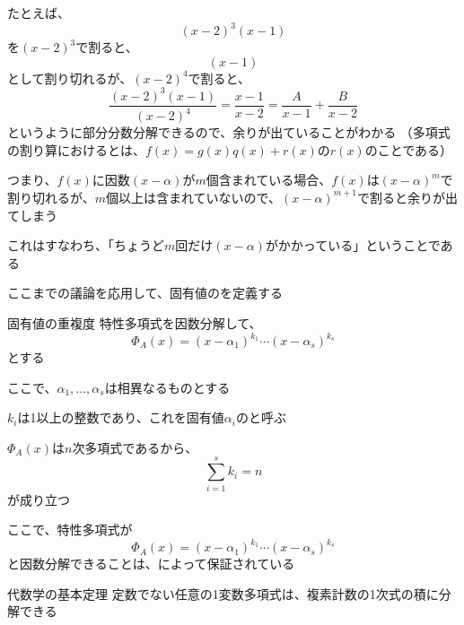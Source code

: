 \documentclass[../../../topic_linear-algebra]{subfiles}
\begin{document}
\br

たとえば、
\begin{equation*}
  (x-2)^3 (x-1)
\end{equation*}
を$(x-2)^3$で割ると、
\begin{equation*}
  (x - 1)
\end{equation*}
として割り切れるが、$(x-2)^4$で割ると、
\begin{equation*}
  \frac{(x-2)^3 (x-1)}{(x-2)^4} = \frac{x-1}{x-2} = \frac{A}{x-1} + \frac{B}{x-2}
\end{equation*}
というように部分分数分解できるので、余りが出ていることがわかる
（多項式の割り算におけるとは、$f(x) = g(x)q(x) + r(x)$の$r(x)$のことである）

\br

つまり、$f(x)$に因数$(x-\alpha)$が$m$個含まれている場合、$f(x)$は$(x-\alpha)^m$で割り切れるが、$m$個以上は含まれていないので、$(x-\alpha)^{m+1}$で割ると余りが出てしまう

これはすなわち、「ちょうど$m$回だけ$(x-\alpha)$がかかっている」ということである

\sectionline

ここまでの議論を応用して、固有値のを定義する

\begin{definition}{固有値の重複度}\label{def:algebraic-multiplicity}
  特性多項式を因数分解して、
  \begin{equation*}
    \Phi_A(x) = (x- \alpha_1)^{k_1}\cdots (x - \alpha_s)^{k_s}
  \end{equation*}
  とする

  ここで、$\alpha_1,\ldots, \alpha_s$は相異なるものとする

  $k_i$は1以上の整数であり、これを固有値$\alpha_i$のと呼ぶ

  $\Phi_A(x)$は$n$次多項式であるから、
  \begin{equation*}
    \sum_{i=1}^s k_i = n
  \end{equation*}
  が成り立つ
\end{definition}

ここで、特性多項式が
\begin{equation*}
  \Phi_A(x) = (x- \alpha_1)^{k_1}\cdots (x - \alpha_s)^{k_s}
\end{equation*}
と因数分解できることは、によって保証されている

\begin{theorem}{代数学の基本定理}
  定数でない任意の1変数多項式は、複素計数の1次式の積に分解できる
\end{theorem}
\end{document}
